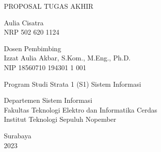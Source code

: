 \color{white}
\begin{large}
  PROPOSAL TUGAS AKHIR 
\end{large}

\vspace{\fill}

\begin{spacing}{1.5}
  \begin{Large}
    \tatitle
  \end{Large}
\end{spacing}

\vspace{\fill}

\begin{large}
  Aulia Cisatra \\
  \textmd{NRP 502 620 1124}
\end{large}

\vspace{\fill}

\begin{large}
  \textmd{Dosen Pembimbing} \\
  Izzat Aulia Akbar, S.Kom., M.Eng., Ph.D. \\
  \textmd{NIP 18560710 194301 1 001} \\
\end{large}

\vspace{\fill}

Program Studi Strata 1 (S1) Sistem Informasi \\

\mdseries

Departemen Sistem Informasi \\
Fakultas Teknologi Elektro dan Informatika Cerdas \\
Institut Teknologi Sepuluh Nopember

Surabaya \\
2023

